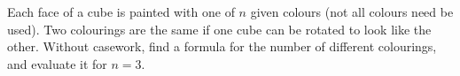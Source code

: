 Each face of a cube is painted with one of $n$ given colours (not all colours need be used). Two colourings are the same if one cube can be rotated to look like the other. Without casework, find a formula for the number of different colourings, and evaluate it for $n=3$.
